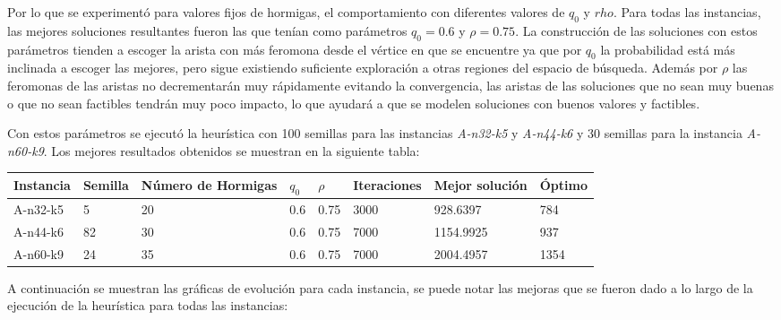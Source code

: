 \documentclass[12pt]{article}
\begin{document}
	Por lo que se experimentó para valores fijos de hormigas, el comportamiento con
	diferentes valores de $q_0$ y $rho$.
	Para todas las instancias, las mejores soluciones resultantes fueron las que 
	tenían como parámetros $q_0=0.6$ y $\rho=0.75$. La construcción de las soluciones
	con estos parámetros tienden a escoger la arista con más feromona desde el vértice en que se encuentre ya que por $q_0$ la probabilidad está más inclinada a
	escoger las mejores, pero sigue existiendo suficiente exploración a otras 
	regiones del espacio de búsqueda. Además por $\rho$ las feromonas de las aristas
	no decrementarán muy rápidamente evitando la convergencia, las aristas de las 
	soluciones que no sean muy
	buenas o que no sean factibles tendrán muy poco impacto, lo que ayudará a que 
	se modelen soluciones con buenos valores y factibles.
	
	Con estos parámetros se ejecutó la heurística con 100 semillas para las 
	instancias \textit{A-n32-k5} y \textit{A-n44-k6} y 30 semillas para la instancia
	 \textit{A-n60-k9}. Los mejores resultados obtenidos se muestran en la siguiente
	 tabla:
	 
	 \begin{table}[!h]
	 	\centering
	 	
	 	\begin{tabular}{|p{}|p{}|p{}|p{}|p{}|p{}|p{}|p{}|}
	 		\hline 
	 		Instancia & Semilla & Número de Hormigas & $\displaystyle q_{0}$ & $\displaystyle \rho $ & Iteraciones & Mejor solución & Óptimo \\
	 		\hline 
	 		{\small A-n32-k5} & {\small 5} & {\small 20} & {\small 0.6} & {\small 0.75} & {\small 3000} & {\small 928.6397} & {\small 784} \\
	 		\hline 
	 		{\small A-n44-k6} & {\small 82} & {\small 30} & {\small 0.6} & {\small 0.75} & {\small 7000} & {\small 1154.9925} & {\small 937} \\
	 		\hline 
	 		{\small A-n60-k9} & 24 & {\small 35} & {\small 0.6} & {\small 0.75} & {\small 7000} & 2004.4957 & 1354 \\
	 		\hline
	 	\end{tabular}
	 	
 	\end{table}
	 
	
	A continuación se muestran las gráficas de evolución para cada instancia, se 
	puede notar las mejoras que se fueron dado a lo largo de la ejecución de la 
	heurística para todas las instancias:
	
\end{document}

